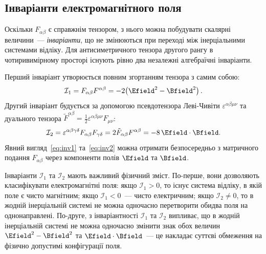 \subsection*{Інваріанти електромагнітного поля}

Оскільки $F_{\alpha\beta}$ є справжнім тензором, з нього можна побудувати скалярні величини~---
\emph{інваріанти}, що не змінюються при переході між інерціальними системами відліку.
Для антисиметричного тензора другого рангу в чотиривимірному просторі існують рівно два
незалежні алгебраїчні інваріанти.

Перший інваріант утворюється повним згортанням тензора з самим собою:
\begin{equation}\label{eq:inv1}
    \mathcal{I}_1 = F_{\alpha\beta}F^{\alpha\beta} = -2\!\left(\Efield^2 - \Bfield^2\right).
\end{equation}
Другий інваріант будується за допомогою псевдотензора Леві-Чивіти
$\varepsilon^{\alpha\beta\mu\nu}$ та дуального тензора
$\tilde{F}^{\alpha\beta} = \tfrac{1}{2}\varepsilon^{\alpha\beta\mu\nu}F_{\mu\nu}$:
\begin{equation}\label{eq:inv2}
    \mathcal{I}_2 = \varepsilon^{\alpha\beta\gamma\delta}F_{\alpha\beta}F_{\gamma\delta}
    = 2\tilde{F}_{\alpha\beta}F^{\alpha\beta}
    = -8\,\Efield\cdot\Bfield.
\end{equation}
Явний вигляд~\eqref{eq:inv1} та~\eqref{eq:inv2} можна отримати безпосередньо з
матричного подання $F_{\alpha\beta}$ через компоненти полів $\Efield$ та $\Bfield$.

Інваріанти $\mathcal{I}_1$ та $\mathcal{I}_2$ мають важливий фізичний зміст.
По-перше, вони дозволяють класифікувати електромагнітні поля: якщо
$\mathcal{I}_1 > 0$, то існує система відліку, в якій поле є чисто магнітним;
якщо $\mathcal{I}_1 < 0$~--- чисто електричним; якщо $\mathcal{I}_2 \neq 0$,
то в жодній інерціальній системі не можна одночасно перетворити обидва поля
на однонаправлені. По-друге, з інваріантності $\mathcal{I}_1$ та $\mathcal{I}_2$ випливає, що
в жодній інерціальній системі не можна одночасно змінити знак обох величин
$\Efield^2 - \Bfield^2$ та $\Efield\cdot\Bfield$~--- це накладає суттєві
обмеження на фізично допустимі конфігурації поля.

